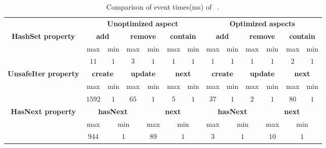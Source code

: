 
\begin{table*}[!ht]
\centering
\small
\begin{tabular}{|c|c|c|c|c|c|c||c|c|c|c|c|c|}
\hline
\multirow{1}{*}{}                                                                
     & \multicolumn{6}{c||}{\bf Unoptimized aspect} & 
\multicolumn{6}{c|}{\bf Optimized aspects} \\ \cline{1-13} 
                                                                                 
 \multirow{3}{*}{\bf HashSet property}    & \multicolumn{2}{c|}{\bf add}  &
 \multicolumn{2}{c|}{\bf remove} & \multicolumn{2}{c||}{\bf contain} &
 \multicolumn{2}{c|}{\bf add}   &
 \multicolumn{2}{c|}{\bf remove} & \multicolumn{2}{c|}{\bf contain}         \\
 \cline{2-13} & max & min & max & min & max & min & max & min & max & min & max & min
 \\\cline{2-13}  
 &  $11$ & $1$   &   $3$     & $1$   &  $1$   & $1$   &   $1$    & $1$   &  $1$   
 & $1$ & $2$ & $1$\\\hline
 
  \multirow{3}{*}{\bf UnsafeIter property}    & \multicolumn{2}{c|}{\bf create} 
  & \multicolumn{2}{c|}{\bf update} & \multicolumn{2}{c||}{\bf next} &
 \multicolumn{2}{c|}{\bf create}   &
 \multicolumn{2}{c|}{\bf update} & \multicolumn{2}{c|}{\bf next}         \\
 \cline{2-13} & max & min & max & min & max & min & max & min & max & min & max & min
 \\\cline{2-13}  
 &  $1592$ & $1$   &   $65$     & $1$   &  $5$   & $1$   &   $37$    & $1$   & 
 $2$ & $1$ & $80$ & $1$\\\hline
 
   \multirow{3}{*}{\bf HasNext property}    & \multicolumn{3}{c|}{\bf hasNext} 
   & \multicolumn{3}{c||}{\bf next} &
 \multicolumn{3}{c|}{\bf hasNext}   & \multicolumn{3}{c|}{\bf next} \\
 \cline{2-13}
 
 & \multicolumn{1}{c|}{max} & \multicolumn{2}{c|}{min} &  
 \multicolumn{1}{c|}{max} & \multicolumn{2}{c||}{min} &
 \multicolumn{1}{c|}{max} & \multicolumn{2}{c|}{min} &
 \multicolumn{1}{c|}{max} & \multicolumn{2}{c|}{min}  \\\cline{2-13}  
 &   \multicolumn{1}{c|}{$944$} & \multicolumn{2}{c|}{$1$}   &  
 \multicolumn{1}{c|}{$89$} & \multicolumn{2}{c||}{$1$} &  
 \multicolumn{1}{c|}{$3$}   & \multicolumn{2}{c|}{$1$}   & 
 \multicolumn{1}{c|}{$10$}   & \multicolumn{2}{c|}{$1$}   \\\hline
 
 

\end{tabular}
\caption{Comparison of event times(ms) of \dacapo\ \bloat.}
\label{table:eventTime}
\end{table*}


